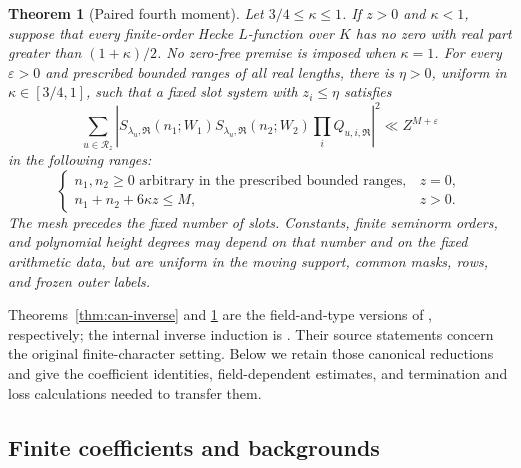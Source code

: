 \documentclass[11pt,a4paper]{article}
\numberwithin{equation}{section}
\newtheorem{theorem}{Theorem}[section]
\theoremstyle{definition}
\theoremstyle{remark}
\newcommand{\eps}{\varepsilon}
\begin{document}
\begin{theorem}[Paired fourth moment]\label{thm:can-fourth}
Let $3/4\le\kappa\le1$.  If $z>0$ and $\kappa<1$, suppose that every finite-order
Hecke $L$-function over $K$ has no zero with real part greater than
$(1+\kappa)/2$.  No zero-free premise is imposed when $\kappa=1$.
For every $\eps>0$ and prescribed bounded ranges of all real lengths,
there is $\eta>0$, uniform in $\kappa\in[3/4,1]$, such that a fixed slot
system with $z_i\le\eta$ satisfies
\begin{equation}\label{eq:can-fourth}
 \sum_{u\in\mathcal R_z}
 \left|S_{\lambda_u,\mathfrak R}(n_1;W_1)
       S_{\lambda_u,\mathfrak R}(n_2;W_2)
       \prod_iQ_{u,i,\mathfrak R}\right|^2
 \ll Z^{M+\eps}
\end{equation}
in the following ranges:
\begin{equation}\label{eq:can-fourth-capacity}
 \begin{cases}
 n_1,n_2\ge0 \text{ arbitrary in the prescribed bounded ranges},&z=0,\\
 n_1+n_2+6\kappa z\le M,&z>0.
 \end{cases}
\end{equation}
The mesh precedes the fixed number of slots.  Constants, finite
seminorm orders, and polynomial height degrees may depend on that
number and on the fixed arithmetic data, but are uniform in the moving
support, common masks, rows, and frozen outer labels.
\end{theorem}

Theorems~\ref{thm:can-inverse} and \ref{thm:can-fourth} are the
field-and-type versions of \cite[Lemmas~17.1 and~18.1]{Q}, respectively;
the internal inverse induction is \cite[Lemma~17.2]{Q}.
Their source statements concern the original finite-character setting.
Below we retain those canonical reductions and give the coefficient
identities, field-dependent estimates, and termination and loss
calculations needed to transfer them.  

\subsection{Finite coefficients and backgrounds}
\end{document}
